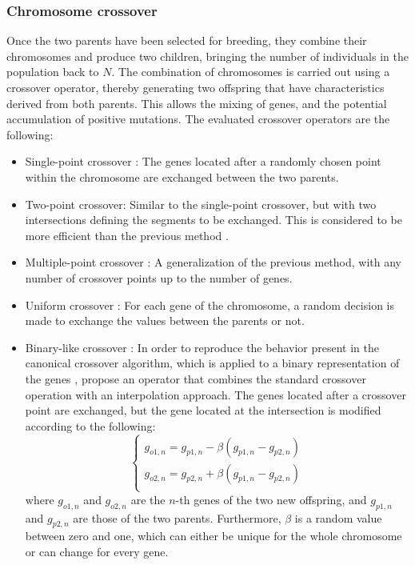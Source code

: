 \documentclass{ametsoc}
\begin{document}
\subsubsection{Chromosome crossover}
\label{sec:gas:crossover}

Once the two parents have been selected for breeding, they combine their chromosomes and produce two children, bringing the number of individuals in the population back to $N$. The combination of chromosomes is carried out using a crossover operator, thereby generating two offspring that have characteristics derived from both parents. This allows the mixing of genes, and the potential accumulation of positive mutations. The evaluated crossover operators are the following:

\begin{itemize}
	\item Single-point crossover \citep{Goldberg1989}: The genes located after a randomly chosen point within the chromosome are exchanged between the two parents.
	
	\item Two-point crossover: Similar to the single-point crossover, but with two intersections defining the segments to be exchanged. This is considered to be more efficient than the previous method \citep{Beasley1993a}.
	
	\item Multiple-point crossover \citep{DeJong1975a}: A generalization of the previous method, with any number of crossover points up to the number of genes.
	
	\item Uniform crossover \citep{Syswerda1989}: For each gene of the chromosome, a random decision is made to exchange the values between the parents or not.
	
	\item Binary-like crossover \citep{Haupt2004}: In order to reproduce the behavior present in the canonical crossover algorithm, which is applied to a binary representation of the genes \citep{Goldberg1989, Goldberg1990a, Herrera1998a}, \citet{Haupt2004} propose an operator that combines the standard crossover operation with an interpolation approach. The genes located after a crossover point are exchanged, but the gene located at the intersection is modified according to the following:
	\begin{equation}
	\left\lbrace \begin{array}{l} 
	g_{o1,n} = g_{p1,n} - \beta (g_{p1,n} - g_{p2,n}) \\
	g_{o2,n} = g_{p2,n} + \beta (g_{p1,n} - g_{p2,n}) \\
	\end{array} \right.
	\label{eq:binary_like_crossover}
	\end{equation}
	where $g_{o1,n}$ and $g_{o2,n}$ are the $n$-th genes of the two new offspring, and $g_{p1,n}$ and $g_{p2,n}$ are those of the two parents. Furthermore, $\beta$ is a random value between zero and one, which can either be unique for the whole chromosome or can change for every gene.
	

\end{itemize}
\end{document}

